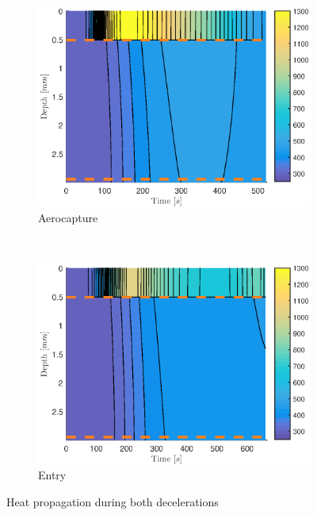 \begin{figure}[h]
	\centering
	\begin{subfigure}[b]{0.45\textwidth}
		\includegraphics[width=\textwidth]{./Figure/Thermal/Thermal_contour_capture.eps}
		\caption{Aerocapture}
		\label{fig:thermoaero}
	\end{subfigure}
	~ %
	\begin{subfigure}[b]{0.45\textwidth}
		\includegraphics[width=\textwidth]{./Figure/Thermal/Thermal_contour_entry.eps}
		\caption{Entry}
		\label{fig:thermoentry}
	\end{subfigure}
	\caption{Heat propagation during both decelerations}\label{fig:heatprop}
\end{figure}

